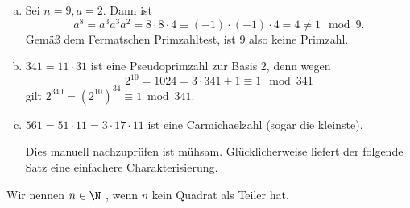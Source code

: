 \begin{ex} \label{3.7}
	\begin{enumerate}[a)]
		\item
			Sei $n = 9, a = 2$.
			Dann ist
			\[
				a^8
				= a^3 a^3 a^2
				= 8 \cdot 8 \cdot 4
				\equiv (-1) \cdot (-1) \cdot 4
				= 4
				\neq 1
				\mod 9.
			\]
			Gemäß dem Fermatschen Primzahltest, ist $9$ also keine Primzahl.
		\item
			$341 = 11 \cdot 31$ ist eine Pseudoprimzahl zur Basis $2$, denn wegen
			\[
				2^{10} = 1024 = 3\cdot 341 + 1
				\equiv 1 \mod 341
			\]
			gilt $2^{340} = (2^{10})^{34} \equiv 1 \bmod 341$.
		\item
			$561 = 51 \cdot 11 = 3 \cdot 17 \cdot 11$ ist eine Carmichaelzahl (sogar die kleinste).

			Dies manuell nachzuprüfen ist mühsam.
			Glücklicherweise liefert der folgende Satz eine einfachere Charakterisierung.
	\end{enumerate}
\end{ex}

\begin{df*}
	Wir nennen $n \in \N$ , wenn $n$ kein Quadrat als Teiler hat.
\end{df*}

